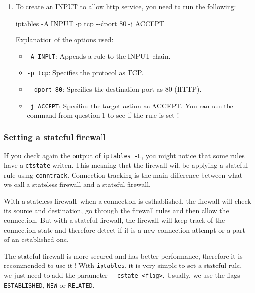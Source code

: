 \documentclass[a4paper,11pt,singlespacing]{article}
\newenvironment{Shaded}{}{}
\newcommand{\AttributeTok}[1]{\textcolor[rgb]{0.49,0.56,0.16}{#1}}
\newcommand{\ExtensionTok}[1]{#1}
\newcommand{\NormalTok}[1]{#1}
\providecommand{\tightlist}{%
  \setlength{\itemsep}{0pt}\setlength{\parskip}{0pt}}
\begin{document}
\begin{enumerate}
\item
  To create an INPUT to allow http service, you need to run the
  following:

\begin{Shaded}
\begin{Highlighting}[]
    \ExtensionTok{iptables} \AttributeTok{{-}A}\NormalTok{ INPUT }\AttributeTok{{-}p}\NormalTok{ tcp }\AttributeTok{{-}{-}dport}\NormalTok{ 80 }\AttributeTok{{-}j}\NormalTok{ ACCEPT}
\end{Highlighting}
\end{Shaded}

  Explanation of the options used:

  \begin{itemize}
  \tightlist
  \item
    \texttt{-A\ INPUT}: Appends a rule to the INPUT chain.
  \item
    \texttt{-p\ tcp}: Specifies the protocol as TCP.
  \item
    \texttt{-\/-dport\ 80}: Specifies the destination port as 80 (HTTP).
  \item
    \texttt{-j\ ACCEPT}: Specifies the target action as ACCEPT. You can
    use the command from question 1 to see if the rule is set !
  \end{itemize}
\end{enumerate}

\subsubsection{Setting a stateful
firewall}\label{setting-a-stateful-firewall}

If you check again the output of \texttt{iptables\ -L}, you might notice
that some rules have a \texttt{ctstate} writen. This meaning that the
firewall will be applying a stateful rule using \texttt{conntrack}.
Connection tracking is the main difference between what we call a
stateless firewall and a stateful firewall.

With a stateless firewall, when a connection is esthablished, the
firewall will check its source and destination, go through the firewall
rules and then allow the connection. But with a stateful firewall, the
firewall will keep track of the connection state and therefore detect if
it is a new connection attempt or a part of an established one.

The stateful firewall is more secured and has better performance,
therefore it is recommended to use it ! With \texttt{iptables}, it is
very simple to set a stateful rule, we just need to add the parameter
\texttt{-\/-cstate\ \textless{}flag\textgreater{}}. Usually, we use the
flags \texttt{ESTABLISHED}, \texttt{NEW} or \texttt{RELATED}.
\end{document}

